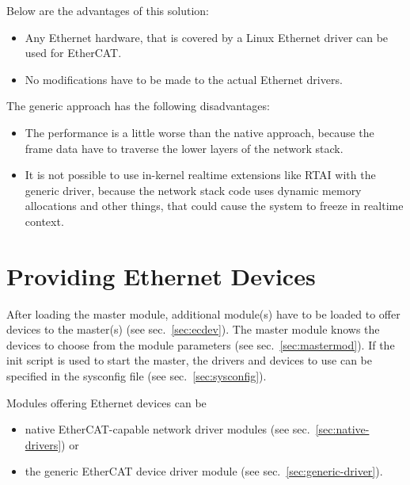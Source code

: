 \documentclass[a4paper,12pt,BCOR6mm,bibtotoc,idxtotoc]{scrbook}
\begin{document}
Below are the advantages of this solution:

\begin{itemize}
\item Any Ethernet hardware, that is covered by a Linux Ethernet driver can be
used for EtherCAT.
\item No modifications have to be made to the actual Ethernet drivers.
\end{itemize}

The generic approach has the following disadvantages:

\begin{itemize}
\item The performance is a little worse than the native approach, because the
frame data have to traverse the lower layers of the network stack.
\item It is not possible to use in-kernel realtime extensions like RTAI with
the generic driver, because the network stack code uses dynamic memory
allocations and other things, that could cause the system to freeze in
realtime context.
\end{itemize}


\section{Providing Ethernet Devices}
\label{sec:providing-devices}

After loading the master module, additional module(s) have to be loaded to
offer devices to the master(s) (see sec.~\ref{sec:ecdev}). The master module
knows the devices to choose from the module parameters (see
sec.~\ref{sec:mastermod}). If the init script is used to start the master, the
drivers and devices to use can be specified in the sysconfig file (see
sec.~\ref{sec:sysconfig}).

Modules offering Ethernet devices can be

\begin{itemize}
\item native EtherCAT-capable network driver modules (see
sec.~\ref{sec:native-drivers}) or
\item the generic EtherCAT device driver module (see
sec.~\ref{sec:generic-driver}).
\end{itemize}

\end{document}
